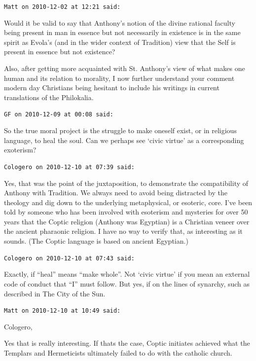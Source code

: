 \begin{footnotesize}\begin{sffamily}
\texttt{Matt on 2010-12-02 at 12:21 said: }

Would it be valid to say that Anthony's notion of the divine rational faculty being present in man in essence but not necessarily in existence is in the same spirit as Evola's (and in the wider context of Tradition) view that the Self is present in essence but not existence?

Also, after getting more acquainted with St. Anthony's view of what makes one human and its relation to morality, I now further understand your comment modern day Christians being hesitant to include his writings in current translations of the Philokalia.

\hfill

\texttt{GF on 2010-12-09 at 00:08 said: }

So the true moral project is the struggle to make oneself exist, or in religious language, to heal the soul. Can we perhaps see ‘civic virtue’ as a corresponding exoterism?


\hfill

\texttt{Cologero on 2010-12-10 at 07:39 said: }

Yes, that was the point of the juxtaposition, to demonstrate the compatibility of Anthony with Tradition. We always need to avoid being distracted by the theology and dig down to the underlying metaphysical, or esoteric, core. I've been told by someone who has been involved with esoterism and mysteries for over 50 years that the Coptic religion (Anthony was Egyptian) is a Christian veneer over the ancient pharaonic religion. I have no way to verify that, as interesting as it sounds. (The Coptic language is based on ancient Egyptian.)


\hfill

\texttt{Cologero on 2010-12-10 at 07:43 said: }

Exactly, if “heal” means “make whole”. Not ‘civic virtue’ if you mean an external code of conduct that “I” must follow. But yes, if on the lines of synarchy, such as described in The City of the Sun.


\hfill

\texttt{Matt on 2010-12-10 at 10:49 said: }

Cologero,

Yes that is really interesting. If thats the case, Coptic initiates achieved what the Templars and Hermeticists ultimately failed to do with the catholic church.


\hfill
\end{sffamily}\end{footnotesize}

